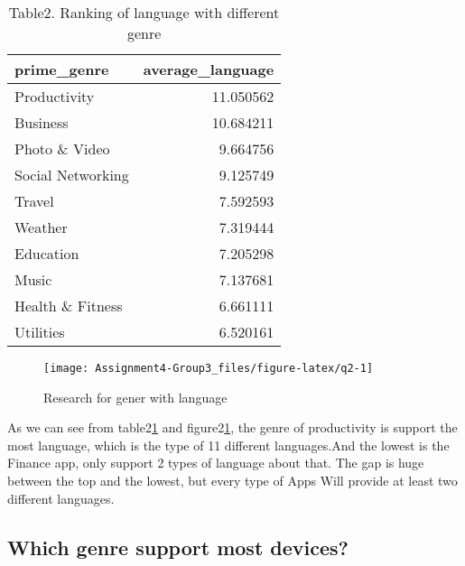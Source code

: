 \documentclass[
]{article}
\begin{document}
\begin{table}[!h]

\caption{\label{tab:q2}Table2. Ranking of language with different genre}
\centering
\begin{tabular}[t]{l|r}
\hline
prime\_genre & average\_language\\
\hline
\rowcolor{gray!6}  Productivity & 11.050562\\
\hline
Business & 10.684211\\
\hline
\rowcolor{gray!6}  Photo \& Video & 9.664756\\
\hline
Social Networking & 9.125749\\
\hline
\rowcolor{gray!6}  Travel & 7.592593\\
\hline
Weather & 7.319444\\
\hline
\rowcolor{gray!6}  Education & 7.205298\\
\hline
Music & 7.137681\\
\hline
\rowcolor{gray!6}  Health \& Fitness & 6.661111\\
\hline
Utilities & 6.520161\\
\hline
\end{tabular}
\end{table}

\begin{figure}

{\centering \texttt{[image: Assignment4-Group3\_files/figure-latex/q2-1]} 

}

\caption{Research for gener with language}\label{fig:q2}
\end{figure}

As we can see from table2\ref{tab:q2} and figure2\ref{fig:q2}, the genre of productivity is support the most language, which is the type of 11 different languages.And the lowest is the Finance app, only support 2 types of language about that. The gap is huge between the top and the lowest, but every type of Apps Will provide at least two different languages.

\hypertarget{which-genre-support-most-devices}{%
\subsection{Which genre support most devices?}\label{which-genre-support-most-devices}}
\end{document}
